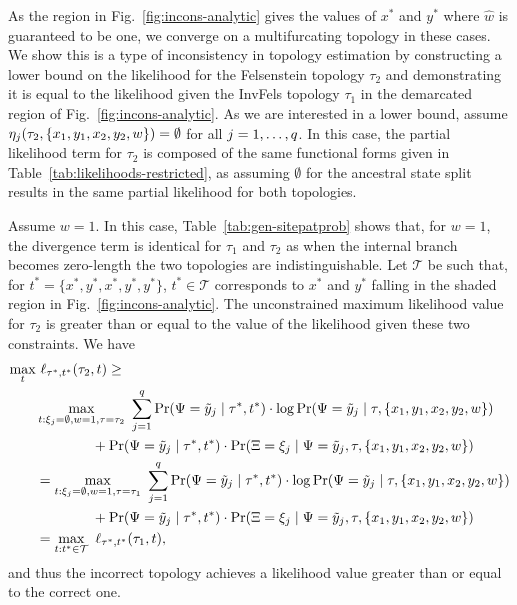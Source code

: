 As the region in Fig.~\ref{fig:incons-analytic} gives the values of $x^*$ and $y^*$ where $\hat{w}$ is guaranteed to be one, we converge on a multifurcating topology in these cases.
We show this is a type of inconsistency in topology estimation by constructing a lower bound on the likelihood for the Felsenstein topology $\tau_2$ and demonstrating it is equal to the likelihood given the InvFels topology $\tau_1$ in the demarcated region of Fig.~\ref{fig:incons-analytic}.
As we are interested in a lower bound, assume $\eta_j(\tau_2,\{x_1,y_1,x_2,y_2,w\})=\emptyset$ for all $j=1,\ldots,q$.
In this case, the partial likelihood term for $\tau_2$ is composed of the same functional forms given in Table~\ref{tab:likelihoods-restricted}, as assuming $\emptyset$ for the ancestral state split results in the same partial likelihood for both topologies.

Assume $w=1$.
In this case, Table~\ref{tab:gen-sitepatprob} shows that, for $w=1$, the divergence term is identical for $\tau_1$ and $\tau_2$ as when the internal branch becomes zero-length the two topologies are indistinguishable.
Let $\mathcal{T}$ be such that, for $t^*=\{x^*,y^*,x^*,y^*,y^*\}$, $t^*\in\mathcal{T}$ corresponds to $x^*$ and $y^*$ falling in the shaded region in Fig.~\ref{fig:incons-analytic}.
The unconstrained maximum likelihood value for $\tau_2$ is greater than or equal to the value of the likelihood given these two constraints.
We have
\begin{align*}
\max_{t} & \ \ell_{\tau^*,t^*}(\tau_2, t) \ge \\
&\max_{t: \xi_j=\emptyset, w=1, \tau=\tau_2} \ \sum_{j=1}^\nSiteSplits \Pr(\siteSplitRV=\siteSplit_j \mid \tau^*, t^*) \cdot \log \Pr(\siteSplitRV=\siteSplit_j \mid \tau, \{x_1,y_1,x_2,y_2,w\}) \\
&\qquad\qquad + \Pr(\siteSplitRV=\siteSplit_j \mid \tau^*, t^*) \cdot \Pr(\ancestralSplitRV=\xi_j \mid \siteSplitRV=\siteSplit_j, \tau, \{x_1,y_1,x_2,y_2,w\}) \\
&= \max_{t: \xi_j=\emptyset, w=1, \tau=\tau_1} \ \sum_{j=1}^\nSiteSplits \Pr(\siteSplitRV=\siteSplit_j \mid \tau^*, t^*) \cdot \log \Pr(\siteSplitRV=\siteSplit_j \mid \tau, \{x_1,y_1,x_2,y_2,w\})\\
&\qquad\qquad + \Pr(\siteSplitRV=\siteSplit_j \mid \tau^*, t^*) \cdot \Pr(\ancestralSplitRV=\xi_j \mid \siteSplitRV=\siteSplit_j, \tau, \{x_1,y_1,x_2,y_2,w\})\\
&= \max_{t : t^*\in\mathcal{T}} \ \ell_{\tau^*,t^*}(\tau_1, t),
\end{align*}
and thus the incorrect topology achieves a likelihood value greater than or equal to the correct one.

